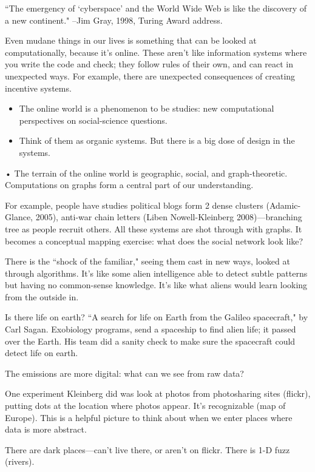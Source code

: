 ``The emergency of `cyberspace' and the World Wide Web is like the discovery of a new continent." --Jim Gray, 1998, Turing Award address.

Even mudane things in our lives is something that can be looked at computationally, because it's online. These aren't like information systems where you write the code and check; they follow rules of their own, and can react in unexpected ways. For example, there are unexpected consequences of creating incentive systems. 

\begin{itemize}
\item
The online world is a phenomenon to be studies: new computational perspectives on social-science questions.
\item
Think of them as organic systems. But there is a big dose of design in the systems.
\end{itemize}•
The terrain of the online world is geographic, social, and graph-theoretic. Computations on graphs form a central part of our understanding.

For example, people have studies political blogs form 2 dense clusters (Adamic-Glance, 2005), anti-war chain letters (Liben Nowell-Kleinberg 2008)---branching tree as people recruit others. All these systems are shot through with graphs. It becomes a conceptual mapping exercise: what does the social network look like?

There is the ``shock of the familiar," seeing them cast in new ways, looked at through algorithms. It's like some alien intelligence able to detect subtle patterns but having no common-sense knowledge. It's like what aliens would learn looking from the outside in.

Is there life on earth? ``A search for life on Earth from the Galileo spacecraft," by Carl Sagan. Exobiology programs, send a spaceship to find alien life; it passed over the Earth. His team did a sanity check to make sure the spacecraft could detect life on earth.

The emissions are more digital: what can we see from raw data?

One experiment Kleinberg did was look at photos from photosharing sites (flickr), putting dots at the location where photos appear. It's recognizable (map of Europe). This is a helpful picture to think about when we enter places where data is more abstract.

There are dark places---can't live there, or aren't on flickr. There is 1-D fuzz (rivers).


